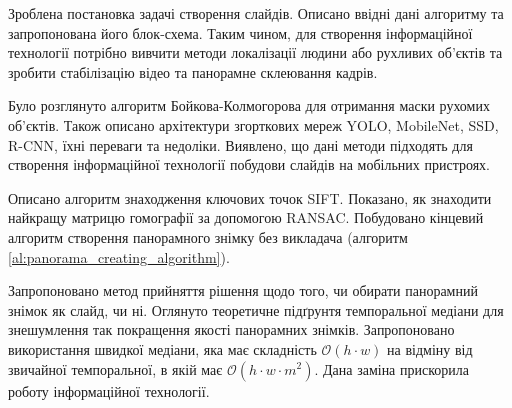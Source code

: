 \chapterConclusion

Зроблена постановка задачі створення слайдів. Описано ввідні
дані алгоритму та запропонована його блок-схема.
Таким чином, для створення інформаційної технології
потрібно вивчити методи локалізації людини або рухливих об'єктів та
зробити стабілізацію відео та панорамне склеювання кадрів.


Було розглянуто алгоритм Бойкова-Колмогорова для
отримання маски рухомих об'єктів. Також описано архітектури
згорткових мереж YOLO, MobileNet, SSD, R-CNN, їхні переваги та недоліки.
Виявлено, що дані методи підходять для
створення інформаційної технології побудови слайдів на
мобільних пристроях.


Описано алгоритм знаходження ключових точок SIFT.
Показано, як знаходити найкращу матрицю гомографії за
допомогою RANSAC. Побудовано кінцевий алгоритм створення
панорамного знімку без викладача (алгоритм \ref{al:panorama_creating_algorithm}).


Запропоновано метод прийняття рішення щодо того, чи обирати панорамний знімок як слайд, чи ні.
Оглянуто теоретичне підґрунтя темпоральної медіани для
знешумлення так покращення якості панорамних знімків. Запропоновано використання швидкої 
медіани, яка має складність $\mathcal{O}(h \cdot w)$ на відміну від звичайної темпоральної, в
якій має $\mathcal{O}(h \cdot w \cdot m^2)$. Дана заміна прискорила роботу інформаційної
технології.